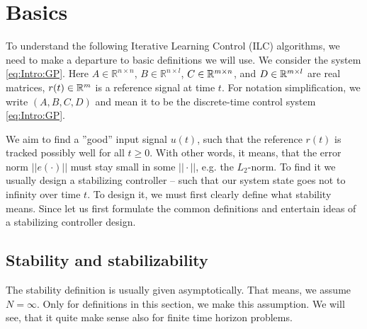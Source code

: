 \chapter{Basics} 
\label{ch:Basics}

To understand the following Iterative Learning Control (ILC) algorithms, we need to make a departure to basic definitions we will use. 
We consider the system \eqref{eq:Intro:GP}. Here $A \in \mathbb{R}^{n\times n}$, $B \in \mathbb{R}^{n \times l}$, $C \in {\mathbb{R}}^{m \times n}$, and $D \in {\mathbb{R}}^{m\times l}$ are real matrices, $r(t) \in {\mathbb{R}}^{m}$ is a reference signal at time $t$. For notation simplification, we write $(A, B,C,D)$ and mean it to be the discrete-time control system \eqref{eq:Intro:GP}.








We aim to find a ''good'' input signal $u(t)$, such that the reference $r(t)$ is tracked possibly well for all $t \geq 0$. With other words, it means, that the error norm $||e(\cdot)||$ must stay small in some  $||\cdot||$, e.g. the $L_2$-norm.
To find it we usually design a stabilizing controller 
 -- such that our system state goes not to infinity over time $t$. 
To design it, we must first clearly define what stability means. Since let us first formulate the common definitions and entertain ideas of a stabilizing controller design. 

\section{Stability and stabilizability}


The stability definition is usually given asymptotically. That means, we assume $N = \infty$. Only for definitions in this section, we make this assumption. We will see, that it quite make sense also for finite time horizon problems.  

